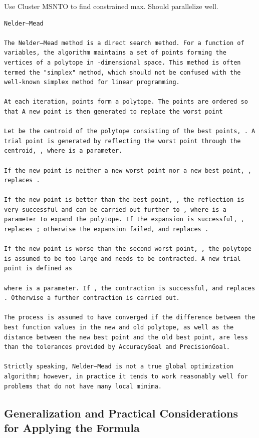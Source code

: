 \documentclass[12pt]{article}
\begin{document}
Use Cluster MSNTO to find constrained max.  Should parallelize well.


\begin{verbatim}
Nelder–Mead

The Nelder–Mead method is a direct search method. For a function of variables, the algorithm maintains a set of points forming the vertices of a polytope in -dimensional space. This method is often termed the "simplex" method, which should not be confused with the well-known simplex method for linear programming.

At each iteration, points form a polytope. The points are ordered so that A new point is then generated to replace the worst point

Let be the centroid of the polytope consisting of the best points, . A trial point is generated by reflecting the worst point through the centroid, , where is a parameter.

If the new point is neither a new worst point nor a new best point, , replaces .

If the new point is better than the best point, , the reflection is very successful and can be carried out further to , where is a parameter to expand the polytope. If the expansion is successful, , replaces ; otherwise the expansion failed, and replaces .

If the new point is worse than the second worst point, , the polytope is assumed to be too large and needs to be contracted. A new trial point is defined as

where is a parameter. If , the contraction is successful, and replaces . Otherwise a further contraction is carried out.

The process is assumed to have converged if the difference between the best function values in the new and old polytope, as well as the distance between the new best point and the old best point, are less than the tolerances provided by AccuracyGoal and PrecisionGoal.

Strictly speaking, Nelder–Mead is not a true global optimization algorithm; however, in practice it tends to work reasonably well for problems that do not have many local minima.
\end{verbatim}


\subsection{Generalization and Practical Considerations for Applying the Formula}
\label{sec:practicalformula}
\end{document}
